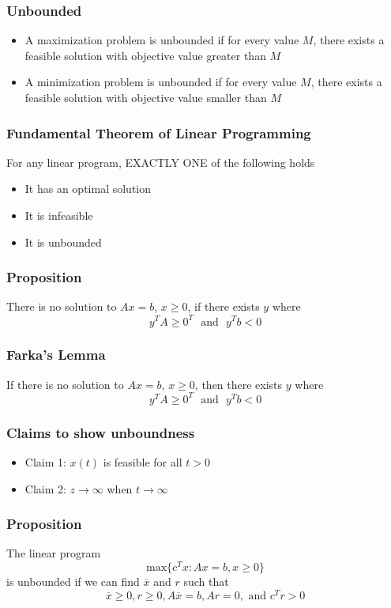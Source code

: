 \documentclass[11pt]{article}
\begin{document}
\subsubsection{Unbounded}
\begin{itemize}
  \item A maximization problem is unbounded if for every value $M$, there exists a feasible solution with objective value greater than $M$
  \item A minimization problem is unbounded if for every value $M$, there exists a feasible solution with objective value smaller than $M$
\end{itemize}
\subsubsection{Fundamental Theorem of Linear Programming}
For any linear program, EXACTLY ONE of the following holds
\begin{itemize}
  \item It has an optimal solution 
  \item It is infeasible 
  \item It is unbounded 
\end{itemize}
\subsubsection{Proposition}
There is no solution to $Ax=b$, $x\geq0$, if there exists $y$ where 
\[y^TA\geq0^T\ \ \ \text{and}\ \ \ y^Tb<0\]
\subsubsection{Farka's Lemma}
If there is no solution to $Ax=b$, $x\geq0$, then there exists $y$ where 
\[y^TA\geq0^T\ \ \ \text{and}\ \ \ y^Tb<0\]
\subsubsection{Claims to show unboundness}
\begin{itemize}
  \item Claim 1: $x(t)$ is feasible for all $t>0$
  \item Claim 2: $z\rightarrow\infty$ when $t\rightarrow\infty$
\end{itemize}
\subsubsection{Proposition}
The linear program \[\text{max}\{c^Tx:Ax=b, x\geq 0\}\]
is unbounded if we can find $\overline{x}$ and $r$ such that \[\overline{x}\geq0, r\geq0, A\overline{x}=b, Ar=0, \text{ and }c^Tr>0\]
\end{document}
